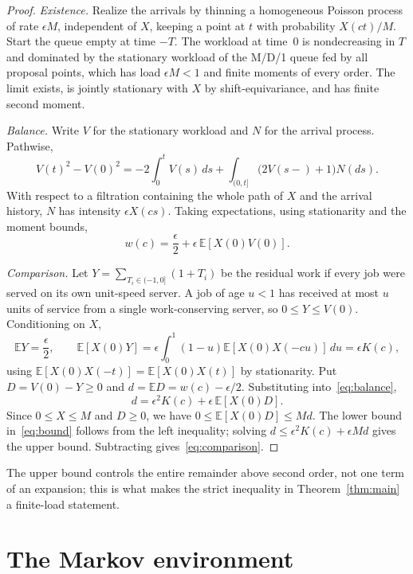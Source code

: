 \documentclass[11pt]{article}
\newcommand{\E}{\mathbb{E}}
\newcommand{\eps}{\epsilon}
\theoremstyle{remark}
\begin{document}
\begin{proof}
\emph{Existence.} Realize the arrivals by thinning a homogeneous Poisson process of rate $\eps M$, independent of $X$, keeping a point at $t$ with probability $X(ct)/M$. Start the queue empty at time $-T$. The workload at time~$0$ is nondecreasing in $T$ and dominated by the stationary workload of the M/D/1 queue fed by all proposal points, which has load $\eps M<1$ and finite moments of every order. The limit exists, is jointly stationary with $X$ by shift-equivariance, and has finite second moment.

\emph{Balance.} Write $V$ for the stationary workload and $N$ for the arrival process. Pathwise,
\[
V(t)^2-V(0)^2=-2\int_0^t V(s)\,ds+\int_{(0,t]}\big(2V(s-)+1\big)N(ds).
\]
With respect to a filtration containing the whole path of $X$ and the arrival history, $N$ has intensity $\eps X(cs)$. Taking expectations, using stationarity and the moment bounds,
\begin{equation}
w(c)=\frac{\eps}{2}+\eps\,\E[X(0)V(0)].
\label{eq:balance}
\end{equation}

\emph{Comparison.} Let $Y=\sum_{T_i\in(-1,0]}(1+T_i)$ be the residual work if every job were served on its own unit-speed server. A job of age $u<1$ has received at most $u$ units of service from a single work-conserving server, so $0\le Y\le V(0)$. Conditioning on $X$,
\[
\E Y=\frac{\eps}{2},\qquad \E[X(0)Y]=\eps\int_0^1(1-u)\E[X(0)X(-cu)]\,du=\eps K(c),
\]
using $\E[X(0)X(-t)]=\E[X(0)X(t)]$ by stationarity. Put $D=V(0)-Y\ge0$ and $d=\E D=w(c)-\eps/2$. Substituting into~\eqref{eq:balance},
\[
d=\eps^2K(c)+\eps\,\E[X(0)D].
\]
Since $0\le X\le M$ and $D\ge0$, we have $0\le\E[X(0)D]\le M d$. The lower bound in~\eqref{eq:bound} follows from the left inequality; solving $d\le\eps^2K(c)+\eps M d$ gives the upper bound. Subtracting gives~\eqref{eq:comparison}.
\end{proof}

The upper bound controls the entire remainder above second order, not one term of an expansion; this is what makes the strict inequality in Theorem~\ref{thm:main} a finite-load statement.

\section{The Markov environment}\label{sec:markov}
\end{document}
